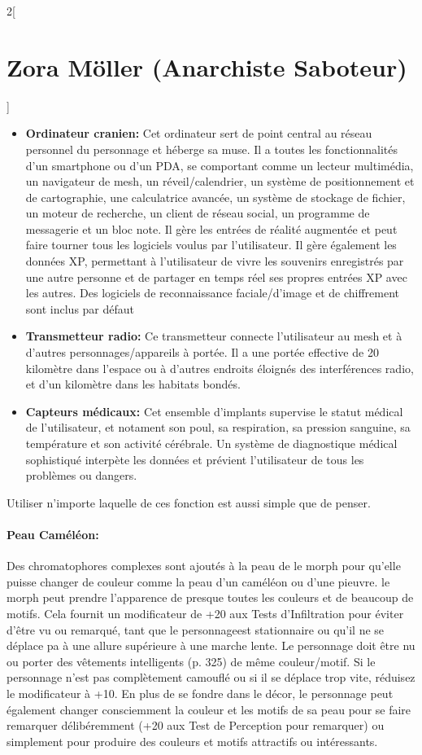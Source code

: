 \documentclass[a4paper,9pt]{article}
\begin{document}
\begin{multicols}{2}[\section*{Zora Möller (Anarchiste Saboteur)}]
\begin{itemize}
   \item \textbf{Ordinateur cranien:} Cet ordinateur sert de point central au
      réseau personnel du personnage et héberge sa muse. Il a toutes
      les fonctionnalités d'un smartphone ou d'un PDA, se comportant comme un
      lecteur multimédia, un navigateur de mesh, un réveil/calendrier, un
      système de positionnement et de cartographie, une calculatrice avancée,
      un système de stockage de fichier, un moteur de recherche, un client de
      réseau social, un programme de messagerie et un bloc note. Il gère les
      entrées de réalité augmentée et peut faire tourner tous les logiciels
      voulus par l'utilisateur. Il gère également les données XP, permettant à
      l'utilisateur de vivre les souvenirs enregistrés par une autre personne et
      de partager en temps réel ses propres entrées XP avec les autres. Des
      logiciels de reconnaissance faciale/d'image et de chiffrement
      sont inclus par défaut
   \item \textbf{Transmetteur radio:} Ce transmetteur connecte l'utilisateur au
      mesh et à d'autres personnages/appareils à portée. Il a une portée
      effective de 20 kilomètre dans l'espace ou à d'autres endroits éloignés
      des interférences radio, et d'un kilomètre dans les habitats bondés.
   \item \textbf{Capteurs médicaux:} Cet ensemble d'implants supervise le
      statut médical de l'utilisateur, et notament son poul, sa respiration, sa
      pression sanguine, sa température et son activité cérébrale. Un système de
      diagnostique médical sophistiqué interpète les données et prévient
      l'utilisateur de tous les problèmes ou dangers.
\end{itemize} 

Utiliser n'importe laquelle de ces fonction est aussi simple que de penser.

\paragraph{Peau Caméléon:} Des chromatophores complexes sont ajoutés à la peau de
le morph pour qu'elle puisse changer de couleur comme la peau d'un caméléon ou
d'une pieuvre. le morph peut prendre l'apparence de presque toutes les couleurs
et de beaucoup de motifs. Cela fournit un modificateur de +20 aux Tests
d'Infiltration pour éviter d'être vu ou remarqué, tant que le personnageest
stationnaire ou qu'il ne se déplace pa à une allure supérieure à une marche
lente. Le personnage doit être nu ou porter des vêtements intelligents (p. 325)
de même couleur/motif. Si le personnage n'est pas complètement camouflé ou si
il se déplace trop vite, réduisez le modificateur à +10. En plus de se fondre
dans le décor, le personnage peut également changer consciemment la couleur et
les motifs de sa peau pour se faire remarquer délibéremment (+20 aux Test de
Perception pour remarquer) ou simplement pour produire des couleurs et motifs
attractifs ou intéressants.


\end{multicols}
\end{document}
